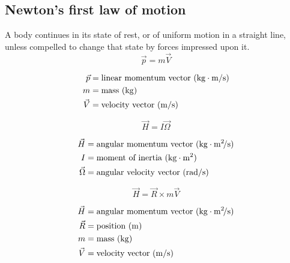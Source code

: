\documentclass{article}
\begin{document}
\subsection{Newton's first law of motion}
\begin{multicols}{2}
A body continues in its state of rest, or of uniform motion in a straight line, unless compelled to change that state by forces impressed upon it.
\vfill\null
\columnbreak
\begin{equation*}
	\boxed{\vec{p} = m\vec{V}}
\end{equation*}

\begin{align*}
\vec{p} &= \text{linear momentum vector (\si{\kilo\gram\meter\per\second})}\\
m &= \text{mass (\si{\kilo\gram})}\\
\vec{V} &= \text{velocity vector (\si{\meter\per\second})}\\
\end{align*}

\end{multicols}

\begin{multicols}{2}
\begin{equation*}
\boxed{\vec{H} = I\vec{\Omega}}
\end{equation*}

\begin{align*}
\vec{H} &= \text{angular momentum vector (\si{\kilo\gram\meter\squared\per\second})}\\
I &= \text{moment of inertia (\si{\kilo\gram\meter\squared})}\\
\vec{\Omega} &= \text{angular velocity vector (\si{\radian\per\second})}\\
\end{align*}

\vfill\null
\columnbreak

\begin{equation*}
\boxed{\vec{H} = \vec{R} \times m\vec{V}}
\end{equation*}

\begin{align*}
\vec{H} &= \text{angular momentum vector (\si{\kilo\gram\meter\squared\per\second})}\\
\vec{R} &= \text{position (\si{\meter})}\\
m &= \text{mass (\si{\kilo\gram})}\\
\vec{V} &= \text{velocity vector (\si{\meter\per\second})}\\
\end{align*}
\vfill\null
\end{multicols}
\end{document}
